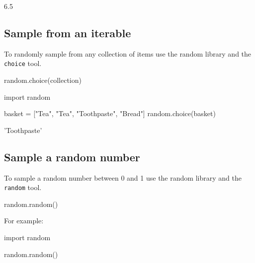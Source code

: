 \begin{raw}
6.5
\end{raw}





\subsection{Sample from an iterable}
\label{\detokenize{tools-for-mathematics/06-probability/how/main:sample-from-an-iterable}}

To randomly sample from any collection of items
use the random library and the \texttt{choice} tool.


\begin{pyin}
random.choice(collection)
\end{pyin}






\begin{pyin}
import random

basket = ["Tea", "Tea", "Toothpaste", "Bread"]
random.choice(basket)
\end{pyin}





\begin{raw}
'Toothpaste'
\end{raw}






\subsection{Sample a random number}
\label{\detokenize{tools-for-mathematics/06-probability/how/main:sample-a-random-number}}

To sample a random number between 0 and 1 use the random library and the
\texttt{random} tool.


\begin{pyin}
random.random()
\end{pyin}



For example:





\begin{pyin}
import random

random.random()
\end{pyin}





